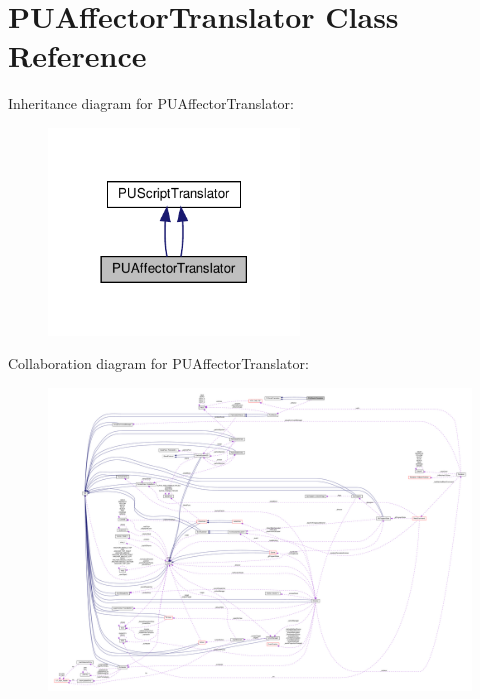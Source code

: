\hypertarget{classPUAffectorTranslator}{}\section{P\+U\+Affector\+Translator Class Reference}
\label{classPUAffectorTranslator}


Inheritance diagram for P\+U\+Affector\+Translator\+:
\nopagebreak
\begin{figure}[H]
\begin{center}
\leavevmode
\includegraphics[width=189pt]{classPUAffectorTranslator__inherit__graph}
\end{center}
\end{figure}


Collaboration diagram for P\+U\+Affector\+Translator\+:
\nopagebreak
\begin{figure}[H]
\begin{center}
\leavevmode
\includegraphics[width=350pt]{classPUAffectorTranslator__coll__graph}
\end{center}
\end{figure}
